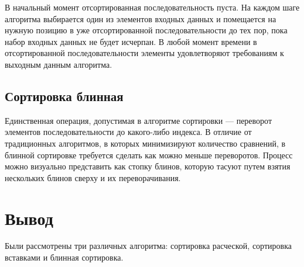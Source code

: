 В начальный момент отсортированная последовательность пуста.
На каждом шаге алгоритма выбирается один из элементов входных данных и помещается на нужную позицию в уже отсортированной последовательности до тех пор, пока набор входных данных не будет исчерпан.
В любой момент времени в отсортированной последовательности элементы удовлетворяют требованиям к выходным данным алгоритма.

\subsection{Сортировка блинная}
Единственная операция, допустимая в алгоритме сортировки — переворот элементов последовательности до какого-либо индекса.
В отличие от традиционных алгоритмов, в которых минимизируют количество сравнений, в блинной сортировке требуется сделать как можно меньше переворотов.
Процесс можно визуально представить как стопку блинов, которую тасуют путем взятия нескольких блинов сверху и их переворачивания.

\section*{Вывод}
Были рассмотрены три различных алгоритма: сортировка расческой, сортировка вставками и блинная сортировка.

